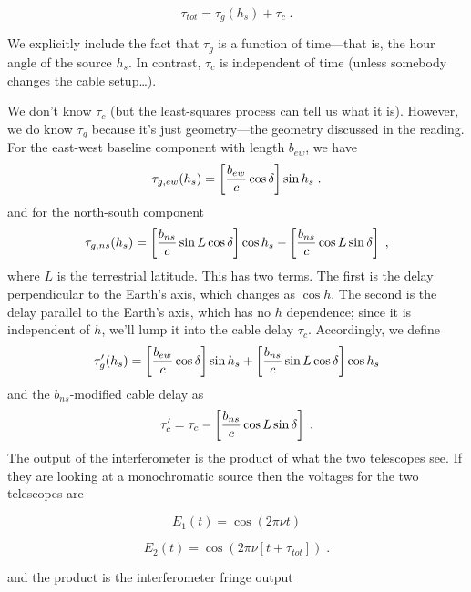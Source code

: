 \documentclass[11pt,preprint]{aastex}
\begin{document}
\begin{equation}
 \tau_{tot} = \tau_g(h_s) + \tau_c \; . 
\end{equation}


\noindent We explicitly include the fact that $\tau_g$ is a function of
time---that is, the hour angle of the source $h_s$. In contrast, $\tau_c$ is
independent of time (unless somebody changes the cable setup\dots).

	We don't know $\tau_c$ (but the least-squares process can tell
us what it is).  However, we do know $\tau_g$ because it's just
geometry---the geometry discussed in the reading.  For the east-west
baseline component with length $b_{ew}$, we have
%
\begin{equation}
 \tau_{g, ew}(h_s) = \left[{b_{ew} \over c} \cos \delta \right] \sin h_s \; . 
\end{equation}
%
and for the north-south component
%
\begin{equation}
 \tau_{g,ns}(h_s) = \left[{b_{ns} \over c} \sin L \cos \delta \right] \cos h_s
 - \left[{b_{ns} \over c} \cos L \sin \delta \right]  \; , 
\end{equation}
%
where $L$ is the terrestrial latitude. This  has two terms. The first is
the delay perpendicular to the Earth's axis, which changes as $\cos h$.
The second is the delay parallel to the Earth's axis, which has no $h$
dependence; since it is independent of $h$, we'll lump it into the cable
delay $\tau_c$. Accordingly, we define
%
\begin{equation}
\tau_g'(h_s) = \left[{b_{ew} \over c} \cos \delta \right] \sin h_s 
  + \left[{b_{ns} \over c} \sin L \cos \delta \right] \cos h_s
\end{equation}
%
and the $b_{ns}$-modified cable delay as
%
\begin{equation}
\tau_c' = \tau_c  - \left[{b_{ns} \over c} \cos L \sin \delta \right]  \; . 
\end{equation}
%
	The output of the interferometer is the product of what the two
telescopes see. If they are looking at a monochromatic source then the
voltages for the two telescopes are

\begin{equation}
 E_1(t) = \cos (2 \pi \nu t) 
\end{equation}


\begin{equation}
 E_2(t) = \cos (2 \pi \nu [t + \tau_{tot}]) \; . 
\end{equation}


\noindent and the product is the interferometer fringe output
\end{document}
